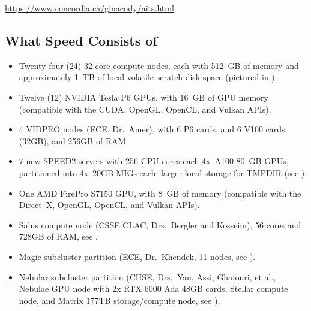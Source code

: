 \url{https://www.concordia.ca/ginacody/aits.html}

\subsection{What Speed Consists of}
\label{sect:speed-arch}

\begin{itemize}
	\item Twenty four (24) 32-core compute nodes, each with 512~GB of memory and
	approximately 1~TB of local volatile-scratch disk space (pictured in ).

	\item Twelve (12) NVIDIA Tesla P6 GPUs, with 16~GB of GPU memory (compatible with the
	CUDA, OpenGL, OpenCL, and Vulkan APIs).

	\item 4 VIDPRO nodes (ECE. Dr.~Amer), with 6 P6 cards, and 6 V100 cards (32GB), and
	256GB of RAM.

	\item 7 new SPEED2 servers with 256 CPU cores each 4x~A100 80~GB GPUs, partitioned
	into 4x~20GB MIGs each; larger local storage for TMPDIR (see ).

	\item One AMD FirePro S7150 GPU, with 8~GB of memory (compatible with the
	Direct~X, OpenGL, OpenCL, and Vulkan APIs).

 	\item Salus compute node (CSSE CLAC, Drs.~Bergler and Kosseim), 56 cores and 728GB of RAM,
	see .

	\item Magic subcluster partition (ECE, Dr.~Khendek, 11 nodes, see ).

	\item Nebular subcluster partition (CIISE, Drs.~Yan, Assi, Ghafouri, et al., Nebulae GPU node with 2x RTX 6000 Ada 48GB cards,
	Stellar compute node, and Matrix 177TB storage/compute node, see ).
\end{itemize}


